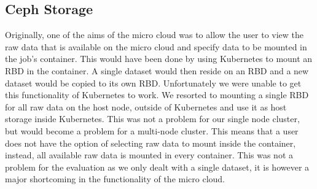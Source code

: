\documentclass{sig-alternate-05-2015}
\begin{document}
\subsection{Ceph Storage}
Originally, one of the aims of the micro cloud was to allow the user to view the raw data that is available
on the micro cloud and specify data to be mounted in the job's container. This would have been done by using Kubernetes to mount an RBD in the container. A single dataset would then reside on an RBD and a new dataset would be copied to its own RBD. Unfortunately we were unable to get this functionality of Kubernetes to work. We resorted to mounting a single RBD for all raw data on the host node, outside of Kubernetes and use it as host storage inside Kubernetes. This was not a problem for our single node cluster, but would become a problem for a multi-node cluster. This means that a user does not have the option of selecting raw data to mount inside the container, instead, all available raw data is mounted in every container. This was not a problem for the evaluation as we only dealt with a single dataset, it is however a major shortcoming in the functionality of the micro cloud. 
\end{document}
